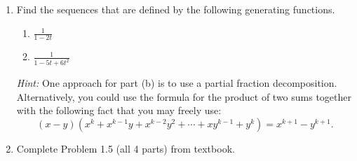 \documentclass[11pt]{article}%
\theoremstyle{definition}
\begin{document}
\begin{enumerate}
\item Find the sequences that are defined by the following generating functions.
\begin{enumerate}
\item $\displaystyle \frac{1}{1-2t}$
\item $\displaystyle \frac{1}{1-5t+6t^2}$
\end{enumerate}
\emph{Hint:} One approach for part (b) is to use a partial fraction decomposition.  Alternatively, you could use the formula for the product of two sums together with the following fact that you may freely use:
\[
(x-y)(x^k+x^{k-1}y+x^{k-2}y^2+\cdots +xy^{k-1}+y^k)=x^{k+1}-y^{k+1}.
\]
\item Complete Problem 1.5 (all 4 parts) from textbook.
\end{enumerate}
\end{document}
